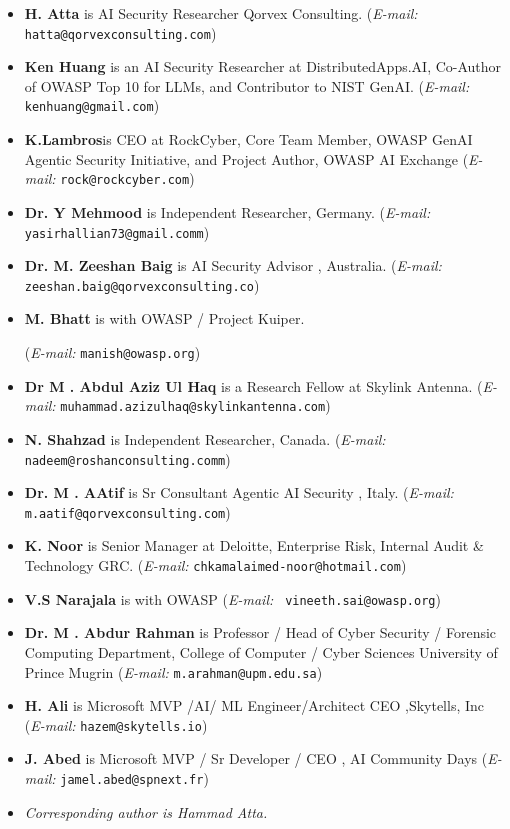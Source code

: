 \documentclass[10pt,twocolumn]{article}
\begin{document}
\begin{itemize}[leftmargin=*,topsep=2pt,itemsep=3pt,parsep=0pt,label={\tiny$\bullet$}]
\small
  \item \textbf{H. Atta} is AI Security Researcher Qorvex Consulting.
        (\textit{E-mail:} 
        \texttt{hatta@qorvexconsulting.com})
  \item \textbf{Ken Huang} is an AI Security Researcher at DistributedApps.AI,
        Co-Author of OWASP Top 10 for LLMs, and Contributor to NIST GenAI.
        (\textit{E-mail:} \texttt{kenhuang@gmail.com})
  \item \textbf{K.Lambros}is CEO at RockCyber, Core Team Member, OWASP
GenAI Agentic Security Initiative, and Project Author, OWASP
AI Exchange
        (\textit{E-mail:} \texttt{rock@rockcyber.com})
  \item \textbf{Dr. Y Mehmood} is  Independent Researcher, Germany.
        (\textit{E-mail:} \texttt{yasirhallian73@gmail.comm})
         \item \textbf{Dr. M. Zeeshan Baig} is AI Security Advisor , Australia.
        (\textit{E-mail:} \texttt{zeeshan.baig@qorvexconsulting.co})
  
  \item \textbf{M. Bhatt} is with OWASP / Project Kuiper.
  
        (\textit{E-mail:} \texttt{manish@owasp.org})
  
  \item \textbf{Dr M . Abdul Aziz Ul Haq} is a Research Fellow at Skylink Antenna.
        (\textit{E-mail:} \texttt{muhammad.azizulhaq@skylinkantenna.com})
  \item \textbf{ N. Shahzad} is  Independent Researcher, Canada.
        (\textit{E-mail:} \texttt{nadeem@roshanconsulting.comm})
        
  
   \item \textbf{Dr. M . AAtif} is Sr Consultant Agentic AI Security  , Italy.
        (\textit{E-mail:} \texttt{m.aatif@qorvexconsulting.com})
  
        \item \textbf{K. Noor} is Senior Manager at Deloitte, Enterprise Risk,
        Internal Audit \& Technology GRC.
        (\textit{E-mail:} \texttt{chkamalaimed-noor@hotmail.com})
         \item \textbf{V.S Narajala  } is with OWASP
        (\textit{E-mail:} \texttt{ vineeth.sai@owasp.org})
        \item \textbf{Dr. M . Abdur Rahman } is Professor / Head of Cyber Security / Forensic Computing Department, College of Computer / Cyber Sciences University of Prince Mugrin
        (\textit{E-mail:} \texttt{m.arahman@upm.edu.sa})
  \item \textbf{H. Ali} is Microsoft MVP /AI/ ML Engineer/Architect CEO ,Skytells, Inc  
        (\textit{E-mail:} 
        \texttt{hazem@skytells.io})
     \item \textbf{J. Abed } is Microsoft MVP / Sr Developer / CEO , AI Community Days 
        (\textit{E-mail:} \texttt{jamel.abed@spnext.fr})
  \item \textit{Corresponding author is Hammad Atta.}
\end{itemize}
\end{document}
